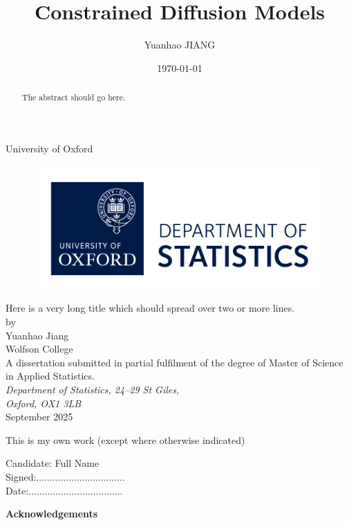 \documentclass[a4paper,12pt]{article}
\title{Constrained Diffusion Models}
\date{\today}
\author{Yuanhao JIANG}
\begin{document}

\begin{titlepage}
\begin{center}
\vspace{1cm}
\textsf{\Huge{University of Oxford \\}}
\vspace{1cm}
\begin{figure}[htb]
\centering
\includegraphics[scale=.8]{./imgs/stats_logo_RGB.jpg}
\end{figure}
\vspace{2.0cm}
\Huge{Here is a very long title which should spread over two or more lines.\\}
\vspace{2.0cm}
\large{ by \\[14pt] Yuanhao Jiang \\[8pt] Wolfson College} \\
\vspace{2.2cm}
\large{A dissertation submitted in partial fulfilment of the degree of Master of Science in Applied Statistics.
} \\
\vspace{.5cm}
\large{\emph{Department of Statistics, 24--29 St Giles, \\Oxford, OX1 3LB}} \\
\vspace{1.0cm}
\large{September 2025} \\
\end{center}
\end{titlepage}
\clearpage

This is my own work (except where otherwise indicated)
\vspace{2.5in}

\begin{center}
Candidate: Full Name\\
\vspace{1.0in}
Signed:.................................\\
\vspace{1.0in}
Date:...................................
\end{center}
\clearpage
\begin{abstract}

The abstract should go here.

\end{abstract}
\clearpage
\vspace*{2in}
\begin{center}
\textbf{Acknowledgements}
\end{center}
\end{document}
